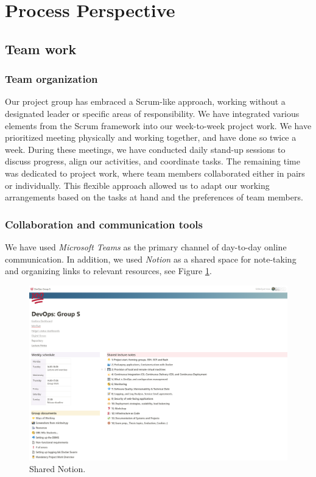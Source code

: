 \section{Process Perspective}


\subsection{Team work}


\subsubsection{Team organization}

Our project group has embraced a Scrum-like approach, working without a designated leader or specific areas of responsibility. We have integrated various elements from the Scrum framework into our week-to-week project work. We have prioritized meeting physically and working together, and have done so twice a week. During these meetings, we have conducted daily stand-up sessions to discuss progress, align our activities, and coordinate tasks. The remaining time was dedicated to project work, where team members collaborated either in pairs or individually. This flexible approach allowed us to adapt our working arrangements based on the tasks at hand and the preferences of team members.

\subsubsection{Collaboration and communication tools}

We have used \textit{Microsoft Teams} as the primary channel of day-to-day online communication. In addition, we used \textit{Notion} as a shared space for note-taking and organizing links to relevant resources, see Figure \ref{fig:notion}. 

\begin{figure}[H]
    \centering
    \includegraphics[width=.85\linewidth]{images/notion.png}
    \caption{Shared Notion.}
    \label{fig:notion}
\end{figure}

